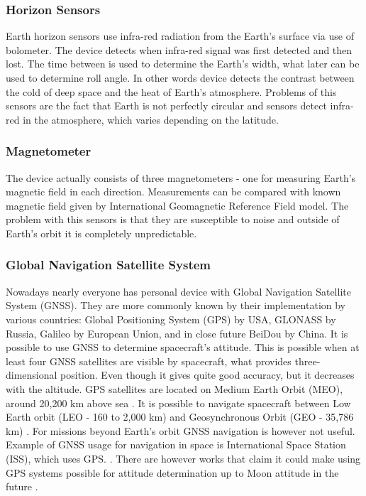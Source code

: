 \documentclass[12pt,a4paper,oneside]{article}
\begin{document}
\subsubsection{Horizon Sensors}
Earth horizon sensors use infra-red radiation from the Earth's surface via use of bolometer. The device detects when infra-red signal was first detected and then lost. The time between is used to determine the Earth's width, what later can be used to determine roll angle. In other words device detects the contrast between the cold of deep space and the heat of Earth's atmosphere. Problems of this sensors are the fact that Earth is not perfectly circular and sensors detect infra-red in the atmosphere, which varies depending on the latitude.
\subsubsection{Magnetometer}
The device actually consists of three magnetometers - one for measuring Earth's magnetic field in each direction. Measurements can be compared with known magnetic field given by International Geomagnetic Reference Field model. The problem with this sensors is that they are susceptible to noise and outside of Earth's orbit it is completely unpredictable.
\subsubsection{Global Navigation Satellite System}
Nowadays nearly everyone has personal device with Global Navigation Satellite System (GNSS). They are more commonly known by their implementation by various countries: Global Positioning System (GPS) by USA, GLONASS by Russia, Galileo by European Union, and in close future BeiDou by China. It is possible to use GNSS to determine spacecraft's attitude. This is possible when at least four GNSS satellites are visible by spacecraft, what provides three-dimensional position. Even though it gives quite good accuracy, but it decreases with the altitude. GPS satellites are located on Medium Earth Orbit (MEO), around 20,200 km above sea \cite{gps-gov}. It is possible to navigate spacecraft between Low Earth orbit (LEO -  160 to 2,000 km) and Geosynchronous Orbit (GEO - 35,786 km) \cite{nasa-gps-navigation}. For missions beyond Earth's orbit GNSS navigation is however not useful. Example of GNSS usage for navigation in space is International Space Station (ISS), which uses GPS. \cite{iss-gps}. There are however works that claim it could make using GPS systems possible for attitude determination up to Moon attitude in the future \cite{capuano2014gnss}.
\end{document}
